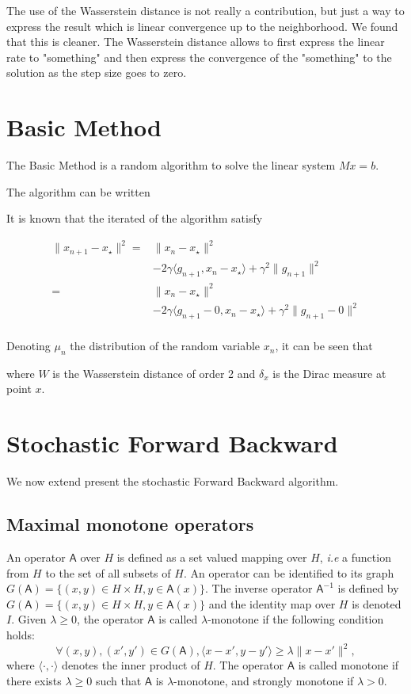 \documentclass{article}
\newcommand{\1}{\mathbbm 1}
\newcommand{\sA}{{\mathsf A}}
\newcommand{\ps}[1]{\langle #1 \rangle}
\newcommand{\asnote}[1]{\todo[color=green!20]{#1}}
\theoremstyle{definition}
\begin{document}
The use of the Wasserstein distance is not really a contribution, but just a way to express the result which is linear convergence up to the neighborhood. We found that this is cleaner. The Wasserstein distance allows to first express the linear rate to "something" and then express the convergence of the "something" to the solution as the step size goes to zero. 

\section{Basic Method}

The Basic Method is a random algorithm to solve the linear system $M x = b$. 

The algorithm can be written

It is known that the iterated of the algorithm satisfy

\begin{align*}
    \|x_{n+1} - x_\star\|^2 =& \|x_{n} - x_\star\|^2 \\
    &- 2\gamma\ps{g_{n+1},x_n - x_\star} + \gamma^2\|g_{n+1}\|^2\\
    =& \|x_{n} - x_\star\|^2 \\
    &- 2\gamma\ps{g_{n+1} - 0,x_n - x_\star} + \gamma^2\|g_{n+1} - 0\|^2\\
\end{align*}

Denoting $\mu_n$ the distribution of the random variable $x_n$, it can be seen that\asnote{to complete}

where $W$ is the Wasserstein distance of order 2 and $\delta_x$ is the Dirac measure at point $x$.

\section{Stochastic Forward Backward}

We now extend present the stochastic Forward Backward algorithm. 

\subsection{Maximal monotone operators}
An operator $\sA$ over $H$ is defined as a set valued mapping over $H$, \textit{i.e} a function from $H$ to the set of all subsets of $H$. An operator can be identified to its graph $G(\sA) = \{(x,y) \in H \times H, y \in \sA(x)\}$. The inverse operator $\sA^{-1}$ is defined by $G(\sA) = \{(x,y) \in H \times H, y \in \sA(x)\}$ and the identity map over $H$ is denoted $I$. Given $\lambda \geq 0$, the operator $\sA$ is called $\lambda$-monotone if the following condition holds: 
\begin{equation}
\forall (x,y),(x',y') \in G(\sA), \ps{x-x',y-y'} \geq \lambda \|x-x'\|^2,
\end{equation}
where $\ps{\cdot,\cdot}$ denotes the inner product of $H$. The operator $\sA$ is called monotone if there exists $\lambda \geq 0$ such that $\sA$ is $\lambda$-monotone, and strongly monotone if $\lambda > 0$.
\end{document}
